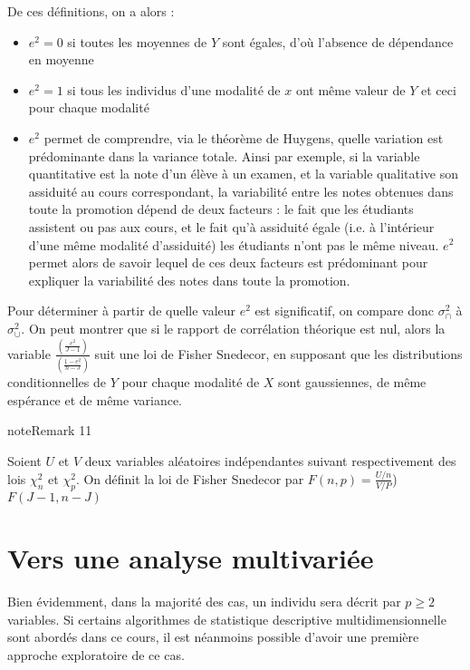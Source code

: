 \documentclass[letterpaper,10pt,french]{sphinxmanual}
\begin{document}
\sphinxAtStartPar
De ces définitions, on a alors :
\begin{itemize}
\item {} 
\sphinxAtStartPar
\(e^2=0\) si toutes les moyennes de \(Y\) sont égales, d’où l’absence de dépendance en moyenne

\item {} 
\sphinxAtStartPar
\(e^2=1\) si tous les individus d’une modalité de \(x\) ont même valeur de \(Y\) et ceci pour chaque modalité

\item {} 
\sphinxAtStartPar
\(e^2\) permet de comprendre, via le théorème de Huygens,  quelle variation est prédominante dans la variance totale. Ainsi par exemple, si la variable quantitative est la note d’un élève à un examen, et la variable qualitative son assiduité au cours correspondant, la variabilité entre les notes obtenues dans toute la promotion dépend de deux
facteurs : le fait que les étudiants assistent ou pas aux cours, et le fait qu’à assiduité
égale (i.e. à l’intérieur d’une même modalité d’assiduité) les étudiants n’ont pas le même niveau. \(e^2\)  permet alors de savoir lequel de ces deux facteurs est prédominant
pour expliquer la variabilité des notes dans toute la promotion.

\end{itemize}

\sphinxAtStartPar
Pour déterminer à partir de quelle valeur \(e^2\) est significatif, on compare donc \(\sigma^2_\cap\) à \(\sigma^2_\cup\). On peut montrer que si le rapport de corrélation théorique est nul, alors la variable \(\frac{\left (\frac{e^2}{J-1}\right )}{\left (\frac{1-e^2}{n-J}\right )}\) suit une loi de Fisher Snedecor, en supposant que les distributions conditionnelles de \(Y\) pour chaque modalité de \(X\) sont gaussiennes, de même espérance et de même variance.
\label{statsdescriptives:remark-22}
\begin{sphinxadmonition}{note}{Remark 11}



\sphinxAtStartPar
Soient \(U\) et \(V\) deux variables aléatoires indépendantes suivant respectivement des lois \(\chi^2_n\) et \(\chi^2_p\). On définit la loi de Fisher Snedecor par \(F(n,p)=\frac{U/n}{V/P}\)) \(F(J-1,n-J)\)
\end{sphinxadmonition}


\section{Vers une analyse multivariée}
\label{\detokenize{statsdescriptives:vers-une-analyse-multivariee}}
\sphinxAtStartPar
Bien évidemment, dans la majorité des cas, un individu sera décrit par \(p\geq 2\) variables. Si certains algorithmes de statistique descriptive multidimensionnelle sont abordés dans ce cours, il est néanmoins possible d’avoir une première approche exploratoire de ce cas.
\end{document}
